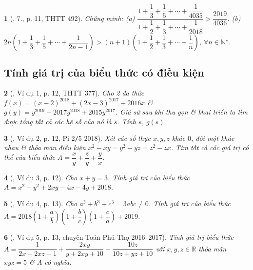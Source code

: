 \documentclass{article}
\newtheorem{baitoan}{}
\begin{document}
\begin{baitoan}[\cite{Lam_An_Tuan_Toan_9_dai_so}, 7., p. 11, THTT 492]
	Chứng minh: (a) $\dfrac{1 + \dfrac{1}{3} + \dfrac{1}{5} + \cdots + \dfrac{1}{4035}}{1 + \dfrac{1}{2} + \dfrac{1}{3} + \cdots + \dfrac{1}{2018}} > \dfrac{2019}{4036}$. (b) $2n\left(1 + \dfrac{1}{3} + \dfrac{1}{5} + \cdots + \dfrac{1}{2n - 1}\right) > (n + 1)\left(1 + \dfrac{1}{2} + \dfrac{1}{3} + \cdots + \dfrac{1}{n}\right)$, $\forall n\in\mathbb{N}^\star$.
\end{baitoan}

\subsection{Tính giá trị của biểu thức có điều kiện}

\begin{baitoan}[\cite{Lam_An_Tuan_Toan_9_dai_so}, Ví dụ 1, p. 12, THTT 377]
	Cho 2 đa thức $f(x) = (x - 2)^{2018} + (2x - 3)^{2017} + 2016x$ \& $g(y) = y^{2019} - 2017y^{2018} + 2015y^{2017}$. Giả sử sau khi thu gọn \& khai triển ta tìm được tổng tất cả các hệ số của nó là $s$. Tính $s$, $g(s)$.
\end{baitoan}

\begin{baitoan}[\cite{Lam_An_Tuan_Toan_9_dai_so}, Ví dụ 2, p. 12, Pi 2{\tt/}5 2018]
	Xét các số thực $x,y,z$ khác $0$, đôi một khác nhau \& thỏa mãn điều kiện $x^2 - xy = y^2 - yz = z^2 - zx$. Tìm tất cả các giá trị có thể của biểu thức $A = \dfrac{x}{y} + \dfrac{z}{y} + \dfrac{y}{x}$.
\end{baitoan}

\begin{baitoan}[\cite{Lam_An_Tuan_Toan_9_dai_so}, Ví dụ 3, p. 12]
	Cho $x + y = 3$. Tính giá trị của biểu thức $A = x^2 + y^2 + 2xy - 4x - 4y + 2018$.
\end{baitoan}

\begin{baitoan}[\cite{Lam_An_Tuan_Toan_9_dai_so}, Ví dụ 4, p. 13]
	Cho $a^3 + b^3 + c^3 = 3abc\ne0$. Tính giá trị của biểu thức $A = 2018\left(1 + \dfrac{a}{b}\right)\left(1 + \dfrac{b}{c}\right)\left(1 + \dfrac{c}{a}\right) + 2019$.
\end{baitoan}

\begin{baitoan}[\cite{Lam_An_Tuan_Toan_9_dai_so}, Ví dụ 5, p. 13, chuyên Toán Phú Thọ 2016--2017]
	Tính giá trị biểu thức $A = \dfrac{1}{2x + 2xz + 1} + \dfrac{2xy}{y + 2xy + 10} + \dfrac{10z}{10z + yz + 10}$ với $x,y,z\in\mathbb{R}$ thỏa mãn $xyz = 5$ \& $A$ có nghĩa.
\end{baitoan}
\end{document}
